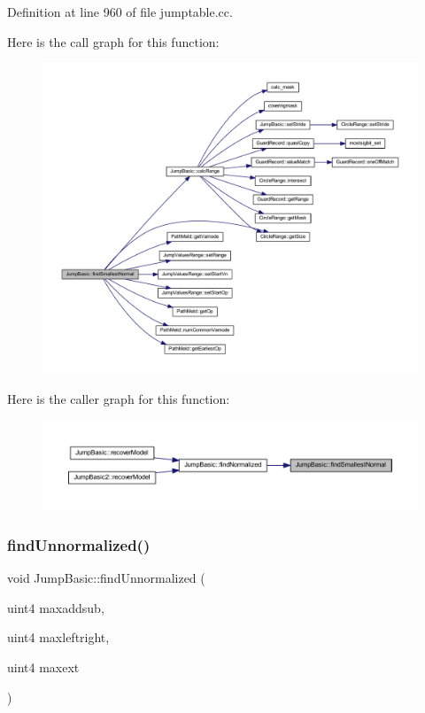 Definition at line 960 of file jumptable.\+cc.

Here is the call graph for this function\+:
\nopagebreak
\begin{figure}[H]
\begin{center}
\leavevmode
\includegraphics[width=350pt]{class_jump_basic_a32cfae8f5cf7b8573e09d415e2b1da52_cgraph}
\end{center}
\end{figure}
Here is the caller graph for this function\+:
\nopagebreak
\begin{figure}[H]
\begin{center}
\leavevmode
\includegraphics[width=350pt]{class_jump_basic_a32cfae8f5cf7b8573e09d415e2b1da52_icgraph}
\end{center}
\end{figure}
\mbox{\label{class_jump_basic_a2d542e5a6b74bd116d89ba4e5bb4da9b}} 
\subsubsection{\texorpdfstring{findUnnormalized()}{findUnnormalized()}}
{\footnotesize\ttfamily void Jump\+Basic\+::find\+Unnormalized (\begin{DoxyParamCaption}\item[{uint4}]{maxaddsub,  }\item[{uint4}]{maxleftright,  }\item[{uint4}]{maxext }\end{DoxyParamCaption})\hspace{0.3cm}{\ttfamily [virtual]}}



